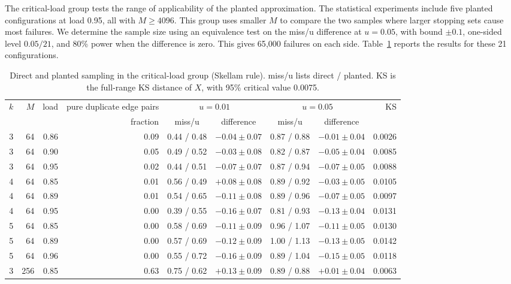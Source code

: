 The critical-load group tests the range of applicability of the planted approximation. The statistical experiments include five planted configurations at load 0.95, all with $M\ge4096$. This group uses smaller $M$ to compare the two samples where larger stopping sets cause most failures. We determine the sample size using an equivalence test on the miss/u difference at $u=0.05$, with bound $\pm0.1$, one-sided level $0.05/21$, and 80\% power when the difference is zero. This gives 65{,}000 failures on each side. Table~\ref{tab:v} reports the results for these 21 configurations.

\begin{table}[!htbp]
\centering
\caption{Direct and planted sampling in the critical-load group (Skellam rule). miss/u lists direct / planted. KS is the full-range KS distance of $X$, with 95\% critical value 0.0075.}
\label{tab:v}
\small
\begin{tabular}{@{}rrrrcccc r@{}}
\toprule
$k$ & $M$ & load & pure duplicate edge pairs & \multicolumn{2}{c}{$u=0.01$} & \multicolumn{2}{c}{$u=0.05$} & KS\\
\cmidrule(lr){5-6}\cmidrule(lr){7-8}
& & & fraction & miss/u & difference & miss/u & difference & \\
\midrule
3 & 64 & 0.86 & 0.09 & 0.44 / 0.48 & $-0.04\pm0.07$ & 0.87 / 0.88 & $-0.01\pm0.04$ & 0.0026\\
3 & 64 & 0.90 & 0.05 & 0.49 / 0.52 & $-0.03\pm0.08$ & 0.82 / 0.87 & $-0.05\pm0.04$ & 0.0085\\
3 & 64 & 0.95 & 0.02 & 0.44 / 0.51 & $-0.07\pm0.07$ & 0.87 / 0.94 & $-0.07\pm0.05$ & 0.0088\\
4 & 64 & 0.85 & 0.01 & 0.56 / 0.49 & $+0.08\pm0.08$ & 0.89 / 0.92 & $-0.03\pm0.05$ & 0.0105\\
4 & 64 & 0.89 & 0.01 & 0.54 / 0.65 & $-0.11\pm0.08$ & 0.89 / 0.96 & $-0.07\pm0.05$ & 0.0097\\
4 & 64 & 0.95 & 0.00 & 0.39 / 0.55 & $-0.16\pm0.07$ & 0.81 / 0.93 & $-0.13\pm0.04$ & 0.0131\\
5 & 64 & 0.85 & 0.00 & 0.58 / 0.69 & $-0.11\pm0.09$ & 0.96 / 1.07 & $-0.11\pm0.05$ & 0.0130\\
5 & 64 & 0.89 & 0.00 & 0.57 / 0.69 & $-0.12\pm0.09$ & 1.00 / 1.13 & $-0.13\pm0.05$ & 0.0142\\
5 & 64 & 0.96 & 0.00 & 0.55 / 0.72 & $-0.16\pm0.09$ & 0.89 / 1.04 & $-0.15\pm0.05$ & 0.0118\\
3 & 256 & 0.85 & 0.63 & 0.75 / 0.62 & $+0.13\pm0.09$ & 0.89 / 0.88 & $+0.01\pm0.04$ & 0.0063\\

\end{tabular}
\end{table}
